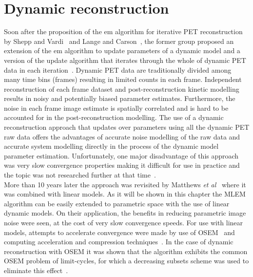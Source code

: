 \section{Dynamic reconstruction}
\label{section:Fully_4D_reconstruction}
Soon after the proposition of the \gls{em} algorithm for iterative PET reconstruction by Shepp and Vardi~\cite{Vardi1985} and Lange and Carson~\cite{Lange1984}, the former group proposed an extension of the \gls{em} algorithm to update parameters of a dynamic model and a version of the update algorithm that iterates through the whole of dynamic PET data in each iteration~\cite{Carson1985}. Dynamic PET data are traditionally divided among many time bins (frames) resulting in limited counts in each frame. Independent reconstruction of each frame dataset and post-reconstruction kinetic modelling results in noisy and potentially biased parameter estimates. Furthermore, the noise in each frame image estimate is spatially correlated and is hard to be accounted for in the post-reconstruction modelling. The use of a dynamic reconstruction approach that updates over parameters using all the dynamic PET raw data offers the advantages of accurate noise modelling of the raw data and accurate system modelling directly in the process of the dynamic model parameter estimation. Unfortunately, one major disadvantage of this approach was very slow convergence properties making it difficult for use in practice and the topic was not researched further at that time~\cite{Carson1985}. \\
More than 10 years later the approach was revisited by Matthews \textit{et al}~\cite{Matthews1995} where it was combined with linear models. As it will be shown in this chapter the MLEM algorithm can be easily extended to parametric space with the use of linear dynamic models. On their application, the benefits in reducing parametric image noise were seen, at the cost of very slow convergence speeds. For use with linear models, attempts to accelerate convergence were made by use of OSEM~\cite{Tsoumpas2008} and computing acceleration and compression techniques~\cite{Hong2008}. In the case of dynamic reconstruction with OSEM it was shown that the algorithm exhibits the common OSEM problem of limit-cycles, for which a decreasing subsets scheme was used to eliminate this effect~\cite{Angelis2011}. \\
